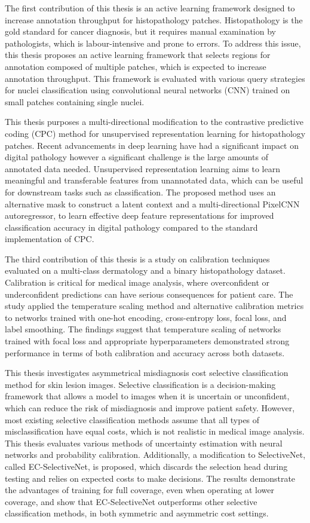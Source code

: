 \documentclass[12pt]{report}
\begin{document}
	The first contribution of this thesis is an active learning framework designed to increase annotation throughput for histopathology patches. Histopathology is the gold standard for cancer diagnosis, but it requires manual examination by pathologists, which is labour-intensive and prone to errors. To address this issue, this thesis proposes an active learning framework that selects regions for annotation composed of multiple patches, which is expected to increase annotation throughput. This framework is evaluated with various query strategies for nuclei classification using convolutional neural networks (CNN) trained on small patches containing single nuclei.
	
	This thesis purposes a multi-directional modification to the contrastive predictive coding (CPC) method for unsupervised representation learning for histopathology patches. Recent advancements in deep learning have had a significant impact on digital pathology however a significant challenge is the large amounts of annotated data needed. Unsupervised representation learning aims to learn meaningful and transferable features from unannotated data, which can be useful for downstream tasks such as classification. The proposed method uses an alternative mask to construct a latent context and a multi-directional PixelCNN autoregressor, to learn effective deep feature representations for improved classification accuracy in digital pathology compared to the standard implementation of CPC.
	
	The third contribution of this thesis is a study on calibration techniques evaluated on a multi-class dermatology and a binary histopathology dataset. Calibration is critical for medical image analysis, where overconfident or underconfident predictions can have serious consequences for patient care. The study applied the temperature scaling method and alternative calibration metrics to networks trained with one-hot encoding, cross-entropy loss, focal loss, and label smoothing. The findings suggest that temperature scaling of networks trained with focal loss and appropriate hyperparameters demonstrated strong performance in terms of both calibration and accuracy across both datasets.
	
	This thesis investigates asymmetrical misdiagnosis cost selective classification method for skin lesion images. Selective classification is a decision-making framework that allows a model to images when it is uncertain or unconfident, which can reduce the risk of misdiagnosis and improve patient safety. However, most existing selective classification methods assume that all types of misclassification have equal costs, which is not realistic in medical image analysis. This thesis evaluates various methods of uncertainty estimation with neural networks and probability calibration. Additionally, a modification to SelectiveNet, called EC-SelectiveNet, is proposed, which discards the selection head during testing and relies on expected costs to make decisions. The results demonstrate the advantages of training for full coverage, even when operating at lower coverage, and show that EC-SelectiveNet outperforms other selective classification methods, in both symmetric and asymmetric cost settings.
	
\end{document}
